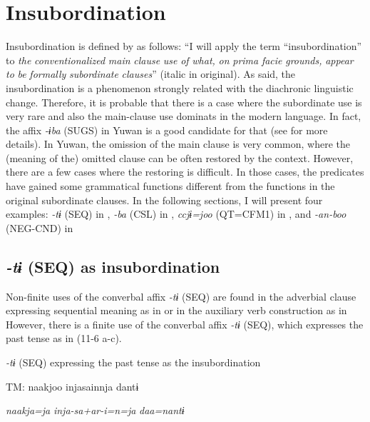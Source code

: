 \section{Insubordination}\label{sec:11.2}

Insubordination is defined by \citet[367]{Evans2007} as follows: “I will apply the term “insubordination” to \textit{the} \textit{conventionalized} \textit{main} \textit{clause} \textit{use} \textit{of} \textit{what,} \textit{on} \textit{prima} \textit{facie} \textit{grounds,} \textit{appear} \textit{to} \textit{be} \textit{formally} \textit{subordinate} \textit{clauses}” (italic in original). As \citet[367]{Evans2007} said, the insubordination is a phenomenon strongly related with the diachronic linguistic change. Therefore, it is probable that there is a case where the subordinate use is very rare and also the main-clause use dominats in the modern language. In fact, the affix \textit{{}-ɨba} (SUGS) in Yuwan is a good candidate for that (see  for more details). In Yuwan, the omission of the main clause is very common, where the (meaning of the) omitted clause can be often restored by the context. However, there are a few cases where the restoring is difficult. In those cases, the predicates have gained some grammatical functions different from the functions in the original subordinate clauses. In the following sections, I will present four examples: \textit{-tɨ} (SEQ) in , \textit{{}-ba} (CSL) in , \textit{ccjɨ=joo} (QT=CFM1) in , and \textit{{}-an-boo} (NEG-CND) in 

\subsection{\textit{{}-tɨ} (SEQ) as insubordination}\label{sec:11.2.1}

Non-finite uses of the converbal affix \textit{-tɨ} (SEQ) are found in the adverbial clause expressing sequential meaning as in  or in the auxiliary verb construction as in  However, there is a finite use of the converbal affix \textit{-tɨ} (SEQ), which expresses the past tense as in (11-6 a-c).

\ea\label{ex:11-6}  \textit{{}-tɨ} (SEQ) expressing the past tense as the insubordination

  \ea  TM:  naakjoo  injasainnja  dantɨ

      \textit{naakja=ja}  \textit{inja-sa+ar-i=n=ja}  \textit{daa=nantɨ}


